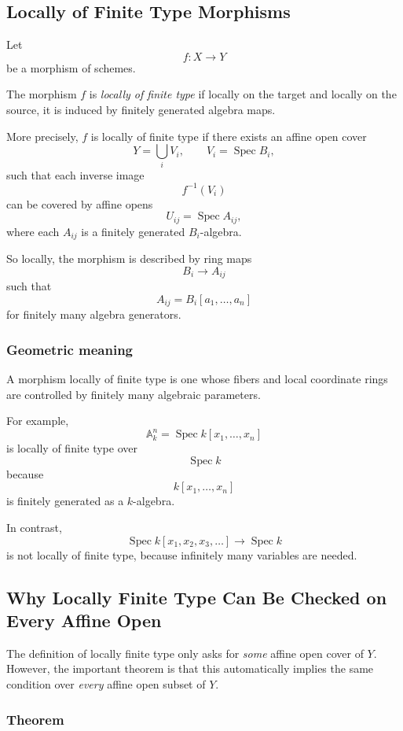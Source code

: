 \documentclass[12pt,a4paper]{article}
\theoremstyle{notespace}
\begin{document}
\subsection{Locally of Finite Type Morphisms}

Let
\[
f:X\to Y
\]
be a morphism of schemes.

The morphism \(f\) is \emph{locally of finite type} if locally on the target and locally on the source, it is induced by finitely generated algebra maps.

More precisely, \(f\) is locally of finite type if there exists an affine open cover
\[
Y=\bigcup_i V_i,
\qquad
V_i=\operatorname{Spec}B_i,
\]
such that each inverse image
\[
f^{-1}(V_i)
\]
can be covered by affine opens
\[
U_{ij}=\operatorname{Spec}A_{ij},
\]
where each \(A_{ij}\) is a finitely generated \(B_i\)-algebra.

So locally, the morphism is described by ring maps
\[
B_i\to A_{ij}
\]
such that
\[
A_{ij}=B_i[a_1,\dots,a_n]
\]
for finitely many algebra generators.

\subsubsection*{Geometric meaning}

A morphism locally of finite type is one whose fibers and local coordinate rings are controlled by finitely many algebraic parameters.

For example,
\[
\mathbb{A}^n_k=\operatorname{Spec}k[x_1,\dots,x_n]
\]
is locally of finite type over
\[
\operatorname{Spec}k
\]
because
\[
k[x_1,\dots,x_n]
\]
is finitely generated as a \(k\)-algebra.

In contrast,
\[
\operatorname{Spec}k[x_1,x_2,x_3,\dots]\to \operatorname{Spec}k
\]
is not locally of finite type, because infinitely many variables are needed.

\subsection{Why Locally Finite Type Can Be Checked on Every Affine Open}

The definition of locally finite type only asks for \emph{some} affine open cover of \(Y\). However, the important theorem is that this automatically implies the same condition over \emph{every} affine open subset of \(Y\).

\subsubsection*{Theorem}
\end{document}
